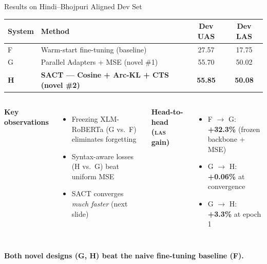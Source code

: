 \documentclass[aspectratio=169,10pt]{beamer}
\newcommand{\bho}{Bhojpuri}
\newcommand{\hi}{Hindi}
\newcommand{\xlmr}{XLM-RoBERTa}
\newcommand{\las}{\textsc{las}}
\begin{document}
\begin{frame}{Results on \hi{}--\bho{} Aligned Dev Set}
\centering
\begin{tabular}{@{}llcc@{}}
\toprule
\textbf{System} & \textbf{Method} & \textbf{Dev UAS} & \textbf{Dev LAS} \\
\midrule
F & Warm-start fine-tuning (baseline)    & 27.57 & 17.75 \\
G & Parallel Adapters + MSE (novel \#1)   & 55.70 & 50.02 \\
\rowcolor{comp1!15}
\textbf{H} & \textbf{SACT --- Cosine + Arc-KL + CTS (novel \#2)} & \textbf{55.85} & \textbf{50.08} \\
\bottomrule
\end{tabular}

\vspace{0.8cm}
\begin{columns}[T]
\textbf{Key observations}
\begin{itemize}\small
  \item Freezing \xlmr{} (G vs.\ F) eliminates forgetting
  \item Syntax-aware losses (H vs.\ G) beat uniform MSE
  \item SACT converges \emph{much faster} (next slide)
\end{itemize}

\textbf{Head-to-head (\las{} gain)}
\begin{itemize}\small
  \item F $\to$ G: \textbf{+32.3\%} (frozen backbone + MSE)
  \item G $\to$ H: \textbf{+0.06\%} at convergence
  \item G $\to$ H: \textbf{+3.3\%} at epoch 1
\end{itemize}
\end{columns}

\vspace{0.4cm}
\centering
\colorbox{comp1!15}{\textbf{Both novel designs (G, H) beat the naive fine-tuning baseline (F).}}
\end{frame}
\end{document}

